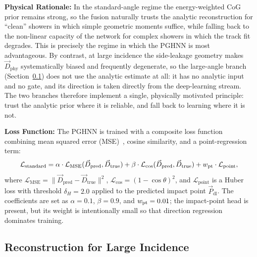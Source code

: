 \documentclass[preprint,12pt]{elsarticle}
\begin{document}
\textbf{Physical Rationale:} In the standard-angle regime the energy-weighted CoG prior remains strong, so the fusion naturally trusts the analytic reconstruction for ``clean'' showers in which simple geometric moments suffice, while falling back to the non-linear capacity of the network for complex showers in which the track fit degrades. This is precisely the regime in which the PGHNN is most advantageous. By contrast, at large incidence the side-leakage geometry makes $\vec{D}_{\text{phy}}$ systematically biased and frequently degenerate, so the large-angle branch (Section~\ref{ssec:large}) does not use the analytic estimate at all: it has no analytic input and no gate, and its direction is taken directly from the deep-learning stream. The two branches therefore implement a single, physically motivated principle: trust the analytic prior where it is reliable, and fall back to learning where it is not.

\textbf{Loss Function:} The PGHNN is trained with a composite loss function combining mean squared error (MSE)~\cite{wang2009mse}, cosine similarity, and a point-regression term:
\begin{equation}
\mathcal{L}_{\text{standard}} = \alpha \cdot \mathcal{L}_{\text{MSE}}(\vec{D}_{\text{pred}}, \vec{D}_{\text{true}}) + \beta \cdot \mathcal{L}_{\cos}(\vec{D}_{\text{pred}}, \vec{D}_{\text{true}}) + w_{\rm pt} \cdot \mathcal{L}_{\text{point}},
\end{equation}
where $\mathcal{L}_{\text{MSE}} = \|\vec{D}_{\text{pred}} - \vec{D}_{\text{true}}\|^2$, $\mathcal{L}_{\cos} = (1 - \cos\theta)^2$, and $\mathcal{L}_{\text{point}}$ is a Huber loss with threshold $\delta_{H}=2.0$ applied to the predicted impact point $\vec{P}_{\text{dl}}$. The coefficients are set as $\alpha=0.1$, $\beta=0.9$, and $w_{\rm pt}=0.01$; the impact-point head is present, but its weight is intentionally small so that direction regression dominates training.

\subsection{Reconstruction for Large Incidence}
\label{ssec:large}

\end{document}
